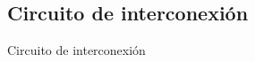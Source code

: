 \documentclass[11pt,a4paper]{beamer}
\begin{document}
		\subsection{Circuito de interconexión}
			\begin{frame}{Circuito de interconexión}
				\begin{itemize}
						

\end{itemize}
\end{frame}
\end{document}
